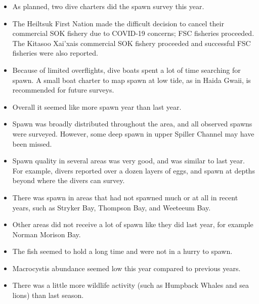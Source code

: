 \begin{itemize}

\item As planned, two dive charters did the spawn survey this year.

\item The Heiltsuk First Nation made the difficult decision to cancel their commercial SOK fishery due to COVID-19 concerns;
FSC fisheries proceeded.
The Kitasoo Xai'xais commercial SOK fishery proceeded and successful FSC fisheries were also reported.

\item Because of limited overflights, dive boats spent a lot of time searching for spawn.
A small boat charter to map spawn at low tide, as in Haida Gwaii, is recommended for future surveys.

\item Overall it seemed like more spawn year than last year.

\item Spawn was broadly distributed throughout the area, and all observed spawns were surveyed.
However, some deep spawn in upper Spiller Channel may have been missed.

\item Spawn quality in several areas was very good, and was similar to last year.
For example, divers reported over a dozen layers of eggs, and spawn at depths beyond where the divers can survey.

\item There was spawn in areas that had not spawned much or at all in recent years, such as Stryker Bay, Thompson Bay, and Weeteeum Bay.

\item Other areas did not receive a lot of spawn like they did last year, for example Norman Morison Bay.

\item The fish seemed to hold a long time and were not in a hurry to spawn.

\item Macrocystis abundance seemed low this year compared to previous years.

\item There was a little more wildlife activity (such as Humpback Whales and sea lions) than last season.

\end{itemize}
